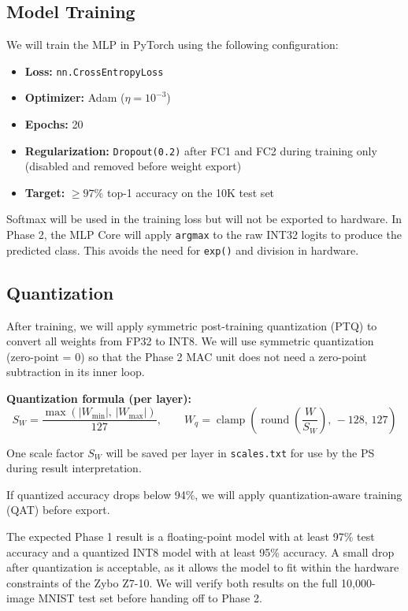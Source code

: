\documentclass[12pt, letterpaper]{article}
\begin{document}
\subsection{Model Training}

We will train the MLP in PyTorch using the following configuration:

\begin{itemize}
    \item \textbf{Loss:} \texttt{nn.CrossEntropyLoss}
    \item \textbf{Optimizer:} Adam ($\eta = 10^{-3}$)
    \item \textbf{Epochs:} 20
    \item \textbf{Regularization:} \texttt{Dropout(0.2)} after FC1 and FC2
          during training only (disabled and removed before weight export)
    \item \textbf{Target:} $\geq 97\%$ top-1 accuracy on the 10K test set
\end{itemize}

Softmax will be used in the training loss but will not be exported to hardware.
In Phase 2, the MLP Core will apply \texttt{argmax} to the raw INT32 logits to
produce the predicted class. This avoids the need for \texttt{exp()} and division
in hardware.

\subsection{Quantization}

After training, we will apply symmetric post-training quantization (PTQ) to convert
all weights from FP32 to INT8. We will use symmetric quantization (zero-point = 0)
so that the Phase 2 MAC unit does not need a zero-point subtraction in its inner loop.

\textbf{Quantization formula (per layer):}
\[
S_W = \frac{\max(|W_{\min}|,\,|W_{\max}|)}{127}, \qquad
W_q = \operatorname{clamp}\!\left(\operatorname{round}\!\left(\frac{W}{S_W}\right),\,-128,\,127\right)
\]

One scale factor $S_W$ will be saved per layer in \texttt{scales.txt} for use by
the PS during result interpretation.

If quantized accuracy drops below 94\%, we will apply quantization-aware
training (QAT) before export.

The expected Phase 1 result is a floating-point model with at least 97\% test accuracy and a quantized INT8 model with at least 95\% accuracy. A small drop after quantization is acceptable, as it allows the model to fit within the hardware constraints of the Zybo Z7-10. We will verify both results on the full 10,000-image MNIST test set before handing off to Phase 2.
\end{document}
